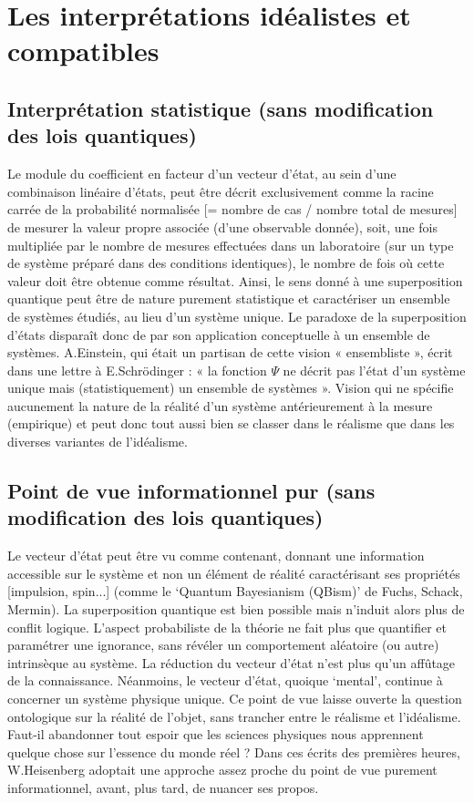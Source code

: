 \section{Les interprétations idéalistes et compatibles}
\subsection{Interprétation statistique (sans modification des lois quantiques)}
Le module du coefficient en facteur d’un vecteur d’état, au sein d’une combinaison linéaire
d’états, peut être décrit exclusivement comme la racine carrée de la probabilité normalisée
[= nombre de cas / nombre total de mesures] de mesurer la valeur propre associée (d’une
observable donnée), soit, une fois multipliée par le nombre de mesures effectuées dans un
laboratoire (sur un type de système préparé dans des conditions identiques), le nombre de
fois où cette valeur doit être obtenue comme résultat. Ainsi, le sens donné à une
superposition quantique peut être de nature purement statistique et caractériser un ensemble
de systèmes étudiés, au lieu d’un système unique. Le paradoxe de la superposition d’états
disparaît donc de par son application conceptuelle à un ensemble de systèmes. A.Einstein,
qui était un partisan de cette vision « ensembliste », écrit dans une lettre à E.Schrödinger : «
la fonction $\Psi$ ne décrit pas l’état d’un système unique mais (statistiquement) un ensemble de
systèmes ». Vision qui ne spécifie aucunement la nature de la réalité d’un système
antérieurement à la mesure (empirique) et peut donc tout aussi bien se classer dans le
réalisme que dans les diverses variantes de l’idéalisme.
\subsection{Point de vue informationnel pur (sans modification des lois
 quantiques)}
 Le vecteur d’état peut être vu comme contenant, donnant une information accessible sur le
système et non un élément de réalité caractérisant ses propriétés [impulsion, spin...]
(comme le ‘Quantum Bayesianism (QBism)’ de Fuchs, Schack, Mermin). La superposition
quantique est bien possible mais n’induit alors plus de conflit logique. L’aspect probabiliste
de la théorie ne fait plus que quantifier et paramétrer une ignorance, sans révéler un
comportement aléatoire (ou autre) intrinsèque au système. La réduction du vecteur d’état
n’est plus qu’un affûtage de la connaissance. Néanmoins, le vecteur d’état, quoique
‘mental’, continue à concerner un système physique unique. Ce point de vue laisse ouverte
la question ontologique sur la réalité de l’objet, sans trancher entre le réalisme et
l’idéalisme. Faut-il abandonner tout espoir que les sciences physiques nous apprennent
quelque chose sur l’essence du monde réel ? Dans ces écrits des premières heures,
W.Heisenberg adoptait une approche assez proche du point de vue purement informationnel,
avant, plus tard, de nuancer ses propos.
